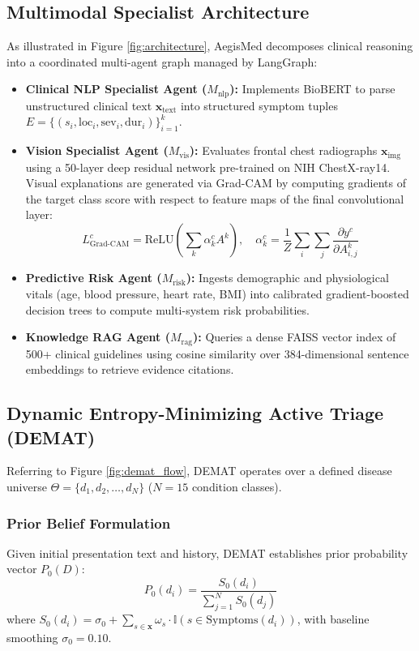 \documentclass[10pt,twocolumn]{article}
\begin{document}
\subsection{Multimodal Specialist Architecture}
As illustrated in Figure \ref{fig:architecture}, AegisMed decomposes clinical reasoning into a coordinated multi-agent graph managed by LangGraph:
\begin{itemize}
    \item \textbf{Clinical NLP Specialist Agent ($M_{\text{nlp}}$):} Implements BioBERT \cite{lee2020biobert} to parse unstructured clinical text $\mathbf{x}_{\text{text}}$ into structured symptom tuples $E = \{(s_i, \text{loc}_i, \text{sev}_i, \text{dur}_i)\}_{i=1}^k$.
    \item \textbf{Vision Specialist Agent ($M_{\text{vis}}$):} Evaluates frontal chest radiographs $\mathbf{x}_{\text{img}}$ using a 50-layer deep residual network \cite{he2016deep} pre-trained on NIH ChestX-ray14. Visual explanations are generated via Grad-CAM \cite{selvaraju2017grad} by computing gradients of the target class score with respect to feature maps of the final convolutional layer:
    $$L_{\text{Grad-CAM}}^c = \text{ReLU}\left(\sum_k \alpha_k^c A^k\right), \quad \alpha_k^c = \frac{1}{Z}\sum_i \sum_j \frac{\partial y^c}{\partial A_{i,j}^k}$$
    \item \textbf{Predictive Risk Agent ($M_{\text{risk}}$):} Ingests demographic and physiological vitals (age, blood pressure, heart rate, BMI) into calibrated gradient-boosted decision trees \cite{chen2016xgboost} to compute multi-system risk probabilities.
    \item \textbf{Knowledge RAG Agent ($M_{\text{rag}}$):} Queries a dense FAISS vector index \cite{johnson2019billion} of 500+ clinical guidelines using cosine similarity over 384-dimensional sentence embeddings to retrieve evidence citations.
\end{itemize}

\subsection{Dynamic Entropy-Minimizing Active Triage (DEMAT)}
Referring to Figure \ref{fig:demat_flow}, DEMAT operates over a defined disease universe $\Theta = \{d_1, d_2, \dots, d_N\}$ ($N = 15$ condition classes). 

\subsubsection{Prior Belief Formulation}
Given initial presentation text and history, DEMAT establishes prior probability vector $P_0(D)$:
\begin{equation}
P_0(d_i) = \frac{S_0(d_i)}{\sum_{j=1}^N S_0(d_j)}
\end{equation}
where $S_0(d_i) = \sigma_0 + \sum_{s \in \mathbf{x}} \omega_s \cdot \mathbb{I}(s \in \text{Symptoms}(d_i))$, with baseline smoothing $\sigma_0 = 0.10$.
\end{document}
